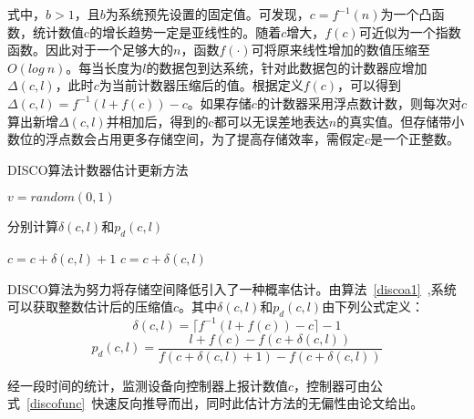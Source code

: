 式中，$ b>1 $，且$ b $为系统预先设置的固定值。可发现，$ c=f^{-1}(n) $为一个凸函数，统计数值c的增长趋势一定是亚线性的。随着$ c $增大，$ f(c) $可近似为一个指数函数。因此对于一个足够大的$ n $，函数$ f(\cdot) $可将原来线性增加的数值压缩至$ O(log~n) $。每当长度为$ l $的数据包到达系统，针对此数据包的计数器应增加$ \Delta(c,l) $，此时$ c $为当前计数器压缩后的值。根据定义$ f(c) $，可以得到$ \Delta(c,l)=f^{-1}(l+f(c))-c $。如果存储$ c $的计数器采用浮点数计数，则每次对$ c $算出新增$ \Delta(c,l) $并相加后，得到的c都可以无误差地表达$ n $的真实值。但存储带小数位的浮点数会占用更多存储空间，为了提高存储效率，需假定$ c $是一个正整数。



\begin{algorithm}[ht]
	\caption{DISCO算法计数器估计更新方法 \label{discoa1}}
	\IncMargin{2em}
	\DontPrintSemicolon
	$ v = random(0,1) $
	
	分别计算$ \delta(c,l) $和$ p_d(c,l) $
	

	{$ c = c + \delta(c,l) +1 $ }
	{$ c = c + \delta(c,l) $ }
\end{algorithm}

DISCO算法为努力将存储空间降低引入了一种概率估计。由算法~\ref{discoa1}~,系统可以获取整数估计后的压缩值$c$。其中$ \delta(c,l) $和$ p_d(c,l) $由下列公式定义：
\begin{equation} \label{discofun2}
\delta(c,l)=\lceil f^{-1}(l+f(c)) - c \rceil - 1
\end{equation}
\begin{equation} \label{discofun3}
p_d(c,l) = \dfrac{l+f(c)-f(c+\delta(c,l))}{f(c+\delta(c,l)+1)-f(c+\delta(c,l))}
\end{equation}

经一段时间的统计，监测设备向控制器上报计数值$ c $，控制器可由公式~\ref{discofunc}~快速反向推导而出，同时此估计方法的无偏性由论文给出。


